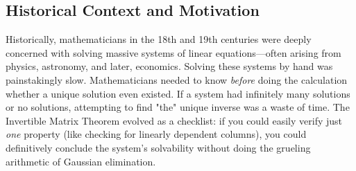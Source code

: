\documentclass[12pt]{article}
\begin{document}
\subsection{Historical Context and Motivation}
Historically, mathematicians in the 18th and 19th centuries were deeply concerned with solving massive systems of linear equations—often arising from physics, astronomy, and later, economics. Solving these systems by hand was painstakingly slow. Mathematicians needed to know \emph{before} doing the calculation whether a unique solution even existed. If a system had infinitely many solutions or no solutions, attempting to find "the" unique inverse was a waste of time. The Invertible Matrix Theorem evolved as a checklist: if you could easily verify just \emph{one} property (like checking for linearly dependent columns), you could definitively conclude the system's solvability without doing the grueling arithmetic of Gaussian elimination.
\end{document}
